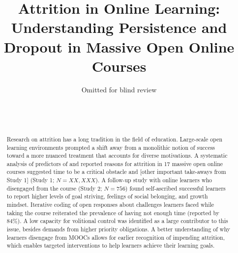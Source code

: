 \documentclass{sigchi}\usepackage[]{graphicx}\usepackage[]{color}
\begin{document}
\title{Attrition in Online Learning: Understanding Persistence and Dropout in Massive Open Online Courses}

\author{
  \alignauthor Omitted for blind review\\
  \\
  \\
  \\
}

\maketitle

\begin{abstract}
Research on attrition has a long tradition in the field of education. Large-scale open learning environments prompted a shift away from a monolithic notion of success toward a more nuanced treatment that accounts for diverse motivations. A systematic analysis of predictors of and reported reasons for attrition in 17 massive open online courses suggested time to be a critical obstacle and [other important take-aways from Study 1] (Study 1; $N = XX,XXX$). A follow-up study with online learners who disengaged from the course (Study 2; $ N = 756$) found self-ascribed successful learners to report higher levels of goal striving, feelings of social belonging, and growth mindset. Iterative coding of open responses about challenges learners faced while taking the course reiterated the prevalence of having not enough time (reported by 84\%). A low capacity for volitional control was identified as a large contributor to this issue, besides demands from higher priority obligations. A better understanding of why learners disengage from MOOCs allows for earlier recognition of impending attrition, which enables targeted interventions to help learners achieve their learning goals.
\end{abstract}
\end{document}
